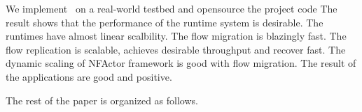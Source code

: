 We implement \nfactor~on a real-world testbed and opensource the project code \cite{projectcode} %
 The result shows that the performance of the runtime system is desirable. The runtimes have almost linear scalbility. The flow migration is blazingly fast. The flow replication is scalable, achieves desirable throughput and recover fast. The dynamic scaling of NFActor framework is good with flow migration. The result of the applications are good and positive.


The rest of the paper is organized as follows.  %








